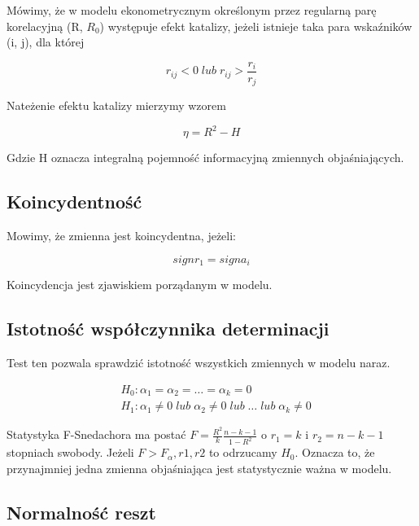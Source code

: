 Mówimy, że w modelu ekonometrycznym określonym przez regularną
parę korelacyjną (R, \(R_0\)) występuje efekt katalizy, jeżeli istnieje taka
para wskaźników (i, j), dla której

\begin{equation}
    r_{ij} < 0 \; lub \; r_{ij}  > \frac{r_i}{r_j}
\end{equation}

Nateżenie efektu katalizy mierzymy wzorem

\[ \eta = R^2 - H \]

Gdzie H oznacza integralną pojemność informacyjną zmiennych objaśniających.

\subsection{Koincydentność}\label{subsec:koincydentność}

Mowimy, że zmienna jest koincydentna, jeżeli:

\begin{equation}
    signr_1 = signa_i
\end{equation}

Koincydencja jest zjawiskiem porządanym w modelu.

\subsection{Istotność współczynnika determinacji}\label{subsec:istotność-współczynnika-determinacji}

Test ten pozwala sprawdzić istotność wszystkich zmiennych w modelu naraz.

\begin{equation}
    \begin{split}
        &H_0: \alpha_1 = \alpha_2 = \dots = \alpha_k = 0 \\
        &H_1: \alpha_1 \ne 0 \; lub \; \alpha_2 \ne 0 \; lub \; \dots \; lub \; \alpha_k \ne 0
    \end{split}
\end{equation}

Statystyka F-Snedachora ma postać \(F = \frac{R^2}{k} \frac{n-k-1}{1-R^2}\) o \(r_1 = k\) i \(r_2 = n-k-1\) stopniach swobody.
Jeżeli \(F > F_\alpha,r1,r2 \) to odrzucamy \(H_0\).
Oznacza to, że przynajmniej jedna zmienna objaśniająca jest statystycznie ważna w modelu.

\subsection{Normalność reszt}\label{subsec:normalność-reszt}

